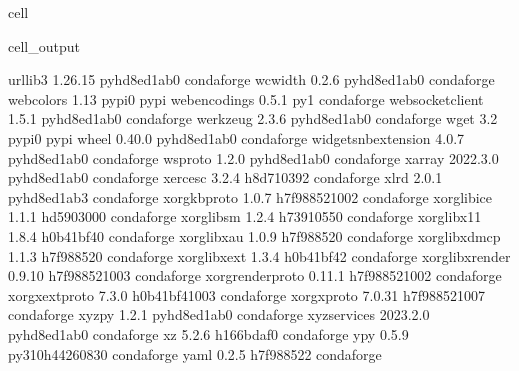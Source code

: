\documentclass[letterpaper,table,10pt,english]{jupyterBook}
\begin{document}
\begin{sphinxuseclass}{cell}
\begin{sphinxVerbatimOutput}
\begin{sphinxuseclass}{cell_output}
\begin{sphinxVerbatim}[commandchars=\\\{\}]
urllib3                   1.26.15            pyhd8ed1ab\PYGZus{}0    conda\PYGZhy{}forge
wcwidth                   0.2.6              pyhd8ed1ab\PYGZus{}0    conda\PYGZhy{}forge
webcolors                 1.13                     pypi\PYGZus{}0    pypi
webencodings              0.5.1                      py\PYGZus{}1    conda\PYGZhy{}forge
websocket\PYGZhy{}client          1.5.1              pyhd8ed1ab\PYGZus{}0    conda\PYGZhy{}forge
werkzeug                  2.3.6              pyhd8ed1ab\PYGZus{}0    conda\PYGZhy{}forge
wget                      3.2                      pypi\PYGZus{}0    pypi
wheel                     0.40.0             pyhd8ed1ab\PYGZus{}0    conda\PYGZhy{}forge
widgetsnbextension        4.0.7              pyhd8ed1ab\PYGZus{}0    conda\PYGZhy{}forge
wsproto                   1.2.0              pyhd8ed1ab\PYGZus{}0    conda\PYGZhy{}forge
xarray                    2022.3.0           pyhd8ed1ab\PYGZus{}0    conda\PYGZhy{}forge
xerces\PYGZhy{}c                  3.2.4                h8d71039\PYGZus{}2    conda\PYGZhy{}forge
xlrd                      2.0.1              pyhd8ed1ab\PYGZus{}3    conda\PYGZhy{}forge
xorg\PYGZhy{}kbproto              1.0.7             h7f98852\PYGZus{}1002    conda\PYGZhy{}forge
xorg\PYGZhy{}libice               1.1.1                hd590300\PYGZus{}0    conda\PYGZhy{}forge
xorg\PYGZhy{}libsm                1.2.4                h7391055\PYGZus{}0    conda\PYGZhy{}forge
xorg\PYGZhy{}libx11               1.8.4                h0b41bf4\PYGZus{}0    conda\PYGZhy{}forge
xorg\PYGZhy{}libxau               1.0.9                h7f98852\PYGZus{}0    conda\PYGZhy{}forge
xorg\PYGZhy{}libxdmcp             1.1.3                h7f98852\PYGZus{}0    conda\PYGZhy{}forge
xorg\PYGZhy{}libxext              1.3.4                h0b41bf4\PYGZus{}2    conda\PYGZhy{}forge
xorg\PYGZhy{}libxrender           0.9.10            h7f98852\PYGZus{}1003    conda\PYGZhy{}forge
xorg\PYGZhy{}renderproto          0.11.1            h7f98852\PYGZus{}1002    conda\PYGZhy{}forge
xorg\PYGZhy{}xextproto            7.3.0             h0b41bf4\PYGZus{}1003    conda\PYGZhy{}forge
xorg\PYGZhy{}xproto               7.0.31            h7f98852\PYGZus{}1007    conda\PYGZhy{}forge
xyzpy                     1.2.1              pyhd8ed1ab\PYGZus{}0    conda\PYGZhy{}forge
xyzservices               2023.2.0           pyhd8ed1ab\PYGZus{}0    conda\PYGZhy{}forge
xz                        5.2.6                h166bdaf\PYGZus{}0    conda\PYGZhy{}forge
y\PYGZhy{}py                      0.5.9           py310h4426083\PYGZus{}0    conda\PYGZhy{}forge
yaml                      0.2.5                h7f98852\PYGZus{}2    conda\PYGZhy{}forge

\end{sphinxVerbatim}
\end{sphinxuseclass}
\end{sphinxVerbatimOutput}
\end{sphinxuseclass}
\end{document}
